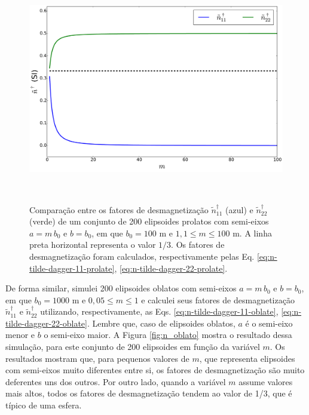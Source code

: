 \begin{figure}[hbt!]
	\centering \includegraphics[width=15cm,height=10cm]{figures/test_n_prolate}
	\caption[Comparação entre os fatores de desmagnetização $\tilde{n}^{\dagger}_{11}$ (azul) e $\tilde{n}^{\dagger}_{22}$ (verde) de um conjunto de 200 elipsoides prolatos com semi-eixos $a=m\, b_0$ e $b=b_0$, em que $b_0=100$ m e $1,1 \le m \le 100$ m. A linha preta horizontal representa o valor $1/3$. Os fatores de desmagnetização foram calculados, respectivamente pelas Eq. \ref{eq:n-tilde-dagger-11-prolate}, \ref{eq:n-tilde-dagger-22-prolate}.]{Comparação entre os fatores de desmagnetização $\tilde{n}^{\dagger}_{11}$ (azul) e $\tilde{n}^{\dagger}_{22}$ (verde) de um conjunto de 200 elipsoides prolatos com semi-eixos $a=m\, b_0$ e $b=b_0$, em que $b_0=100$ m e $1,1 \le m \le 100$ m. A linha preta horizontal representa o valor $1/3$. Os fatores de desmagnetização foram calculados, respectivamente pelas Eq. \ref{eq:n-tilde-dagger-11-prolate}, \ref{eq:n-tilde-dagger-22-prolate}.}
	\label{fig:n_prolato}
\end{figure}

De forma similar, simulei 200 elipsoides oblatos com semi-eixos $a=m\, b_0$ e $b=b_0$, em que $b_0=1000$ m e $0,05 \le m \le 1$ e calculei seus fatores de desmagnetização $\tilde{n}^{\dagger}_{11}$ e $\tilde{n}^{\dagger}_{22}$ utilizando, respectivamente, as Eqs. \ref{eq:n-tilde-dagger-11-oblate}, \ref{eq:n-tilde-dagger-22-oblate}. Lembre que, caso de elipsoides oblatos, $a$ é o semi-eixo menor e $b$ o semi-eixo maior. A Figura \ref{fig:n_oblato} mostra o resultado dessa simulação, para este conjunto de 200 elipsoides em função da variável $m$. Os resultados mostram que, para pequenos valores de $m$, que representa elipsoides com semi-eixos muito diferentes entre si, os fatores de desmagnetização são muito deferentes uns dos outros. Por outro lado, quando a variável $m$ assume valores mais altos, todos os fatores de desmagnetização tendem ao valor de 1/3, que é típico de uma esfera.\\

